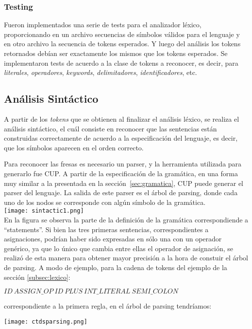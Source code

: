 \documentclass[11pt,a4paper]{article}
\begin{document}
\subsubsection{Testing}

Fueron implementados una serie de tests para el analizador léxico, proporcionando en un archivo secuencias de símbolos válidos para el lenguaje y en otro archivo la secuencia de tokens esperados. Y luego del análisis los tokens retornados debían ser exactamente los mismos que los tokens esperados. Se implementaron tests de acuerdo a la clase de tokens a reconocer, es decir, para \textit{literales}, \textit{operadores}, \textit{keywords}, \textit{delimitadores}, \textit{identificadores}, etc.

\subsection{Análisis Sintáctico} 
\label{subsec:sintactico}
A partir de los \textit{tokens} que se obtienen al finalizar el análisis léxico, se realiza el análisis sintáctico, el cuál consiste en reconocer que las sentencias están construidas correctamente de acuerdo a la especificación del lenguaje, es decir, que los símbolos aparecen en el orden correcto. 

Para reconocer las fresas es necesario un parser, y la herramienta utilizada para generarlo fue CUP. A partir de la especificación de la gramática, en una forma muy similar a la presentada en la sección~\ref{sec:gramatica}, CUP puede generar el parser del lenguaje. La salida de este parser es el árbol de parsing, donde cada uno de los nodos se corresponde con algún símbolo de la gramática.
\\

\texttt{[image: sintactic1.png]} \\ 

En la figura se observa la parte de la definición de la gramática correspondiende a ``statements''. Si bien las tres primeras sentencias, correspondientes a asignaciones, podrían haber sido expresadas en sólo una con un operador genérico, ya que lo único que cambia entre ellas el operador de asignación, se realizó de esta manera para obtener mayor precisión a la hora de constuir el árbol de parsing. A modo de ejemplo, para la cadena de tokens del ejemplo de la sección \ref{subsec:lexico}:
\begin{center}
	$ID \ ASSIGN\_OP \ ID \ PLUS \ INT\_LITERAL \ SEMI\_COLON$
\end{center}
correspondiente a la primera regla, 	en el árbol de parsing tendríamos:
\\
\begin{center}
\texttt{[image: ctdsparsing.png]} \\
\end{center}
\end{document}
